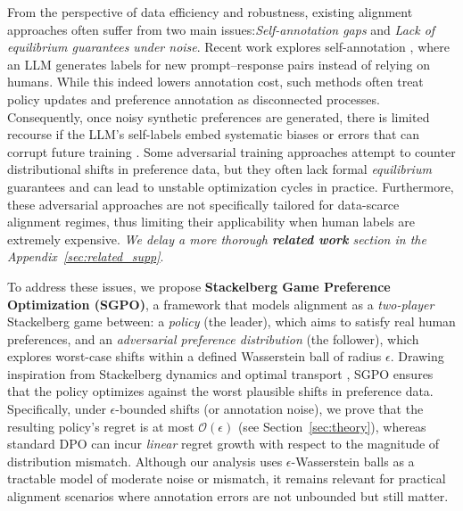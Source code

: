 From the perspective of data efficiency and robustness, existing alignment approaches often suffer from two main issues:\emph{Self-annotation gaps} and \emph{Lack of equilibrium guarantees under noise}. Recent work explores self-annotation \citep{Lee2024Rlaif,Yuan2024Self,Kim2025Spread}, where an LLM generates labels for new prompt--response pairs instead of relying on humans. While this indeed lowers annotation cost, such methods often treat policy updates and preference annotation as disconnected processes. Consequently, once noisy synthetic preferences are generated, there is limited recourse if the LLM’s self-labels embed systematic biases or errors that can corrupt future training \citep{Chowdhury2024Provably}. Some adversarial training approaches \citep{Cheng2023Adversarial,Wu2024Towards} attempt to counter distributional shifts in preference data, but they often lack formal \emph{equilibrium} guarantees and can lead to unstable optimization cycles in practice. Furthermore, these adversarial approaches are not specifically tailored for data-scarce alignment regimes, thus limiting their applicability when human labels are extremely expensive. \emph{We delay a more thorough \textbf{related work} section in the Appendix~\ref{sec:related_supp}}.

To address these issues, we propose \textbf{Stackelberg Game Preference Optimization (SGPO)}, a framework that models alignment as a \emph{two-player} Stackelberg game between: a \emph{policy} (the leader), which aims to satisfy real human preferences, and an \emph{adversarial preference distribution} (the follower), which explores worst-case shifts within a defined Wasserstein ball of radius $\epsilon$. Drawing inspiration from Stackelberg dynamics \citep{Bacsar1998Dynamic} and optimal transport \citep{Villani2009Optimal}, SGPO ensures that the policy optimizes against the worst plausible shifts in preference data. Specifically, under $\epsilon$-bounded shifts (or annotation noise), we prove that the resulting policy’s regret is at most $\mathcal{O}(\epsilon)$ (see Section~\ref{sec:theory}), whereas standard DPO can incur \emph{linear} regret growth with respect to the magnitude of distribution mismatch. Although our analysis uses $\epsilon$-Wasserstein balls as a tractable model of moderate noise or mismatch, it remains relevant for practical alignment scenarios where annotation errors are not unbounded but still matter.

